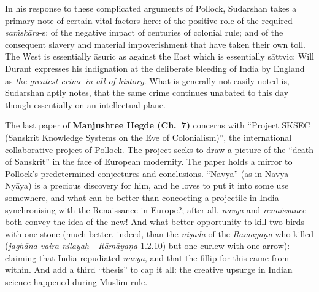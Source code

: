 In his response to these complicated arguments of Pollock, Sudarshan takes a primary note of certain vital factors here: of the positive role of the required {\sl saṁskāra}-s; of the negative impact of centuries of colonial rule; and of the consequent slavery and material impoverishment that have taken their own toll. The West is essentially āsuric as against the East which is essentially sāttvic: Will Durant expresses his indignation at the deliberate bleeding of India by England as {\sl the greatest crime in all of history}. What is generally not easily noted is, Sudarshan aptly notes, that the same crime continues unabated to this day though essentially on an intellectual plane.
\vskip 8pt

The last paper of {\bf Manjushree Hegde (Ch.~7)} concerns with “Project SKSEC (Sanskrit Knowledge Systems on the Eve of Colonialism)”, the international collaborative project of Pollock. The project seeks to draw a picture of the “death of Sanskrit” in the face of European modernity. The paper holds a mirror to Pollock's predetermined conjectures and conclusions. “Navya” (as in Navya Nyāya) is a precious discovery for him, and he loves to put it into some use somewhere, and what can be better than concocting a projectile in India synchronising with the Renaissance in Europe?; after all, {\sl navya} and {\sl renaissance} both convey the idea of the new! And what better opportunity to kill two birds with one stone (much better, indeed, than the {\sl niṣāda} of the {\sl Rāmāyaṇa} who killed ({\sl jaghāna vaira-nilayaḥ - Rāmāyaṇa} 1.2.10) but one curlew with one arrow): claiming that India repudiated {\sl navya}, and that the fillip for this came from within. And add a third “thesis” to cap it all: the creative upsurge in Indian science happened during Muslim rule.

